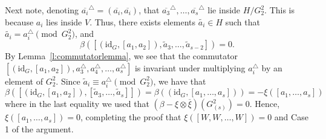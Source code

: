 \documentclass[11pt, a4paper]{amsart}
\theoremstyle{plain}
\theoremstyle{plain}
\theoremstyle{definition}
\theoremstyle{remark}
\numberwithin{equation}{section}
\numberwithin{lemma}{section}
\numberwithin{proposition}{section}
\numberwithin{corollary}{section}
\numberwithin{definition}{section}
\numberwithin{claim}{section}
\begin{document}
Next note, denoting $\overline{a_i}^\triangle = (\overline{a_i}, \overline{a_i})$, that $\overline{a_3}^\triangle, \dots, \overline{a_{s}}^\triangle$ lie inside $H/G_2^2$. This is because $a_i$ lies inside $V$. Thus, there exists elements $\tilde{a_i} \in H$ such that $\tilde{a_i} = a_i^\triangle \pmod{G_2^2}$, and 
$$\beta([(\mathrm{id}_G, [a_1, a_2]), \tilde{a}_3, \dots, \tilde{a}_{s - 2}]) = 0.$$
By Lemma~\ref{l:commutatorlemma}, we see that the commutator $[(\mathrm{id}_G, [a_1, a_2]), a_3^\triangle, a_4^\triangle, \dots, a_{s}^\triangle]$ is invariant under multiplying $a_i^\triangle$ by an element of $G_2^2$. Since $\tilde{a}_i \equiv a_i^\triangle \pmod{G_2^2}$, we have that
$$\beta([(\mathrm{id}_G, [a_1, a_2]), [\tilde{a}_3, \dots, \tilde{a}_{s}]]) = \beta((\mathrm{id}_G, [a_1, \dots, a_s])) = -\xi([a_1, \dots, a_s])$$
where in the last equality we used that $(\beta - \xi \otimes \overline{\xi})(G_{(s)}^2) = 0$. Hence, $\xi([a_1, \dots, a_s]) = 0$, completing the proof that $\xi([W, W, \dots, W]) = 0$ and Case 1 of the argument.
\end{document}
